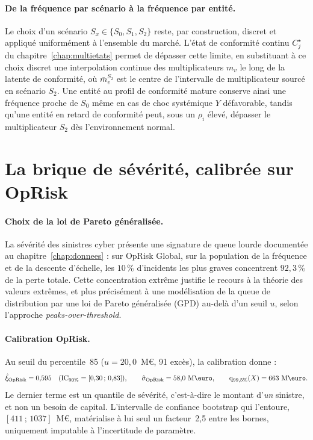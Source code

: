 \paragraph{De la fréquence par scénario à la fréquence par entité.} Le choix
d'un scénario $S_x \in \{S_0, S_1, S_2\}$ reste, par construction, discret et
appliqué uniformément à l'ensemble du marché. L'état de conformité continu
$C^\star_j$ du chapitre~\ref{chap:multietats} permet de dépasser cette
limite, en substituant à ce choix discret une interpolation continue des multiplicateurs
$m_v$ le long de la latente de conformité,
où $\bar{m}_v^{S_2}$ est le centre de l'intervalle de multiplicateur sourcé
en scénario $S_2$. Une entité au profil de conformité mature conserve ainsi
une fréquence proche de $S_0$ même en cas de choc systémique $Y$
défavorable, tandis qu'une entité en retard de conformité peut, sous un
$\rho_i$ élevé, dépasser le multiplicateur $S_2$ dès l'environnement normal.



\section{La brique de sévérité, calibrée sur OpRisk}
\label{soc:sec:severite}


\paragraph{Choix de la loi de Pareto généralisée.} La sévérité des sinistres
cyber présente une signature de queue lourde documentée au chapitre~\ref{chap:donnees} : sur
OpRisk Global, sur la population de la fréquence et de la descente d'échelle, les $10\,\%$ d'incidents les plus
graves concentrent $92{,}3\,\%$
de la perte totale. Cette concentration extrême justifie le recours à la
théorie des valeurs extrêmes, et plus précisément à une modélisation de la
queue de distribution par une loi de Pareto généralisée (GPD) au-delà d'un
seuil $u$, selon l'approche \emph{peaks-over-threshold}.

\paragraph{Calibration OpRisk.} Au seuil du percentile~85
($u = 20{,}0$~M\euro, 91 excès), la calibration donne :
\begin{equation}
\hat{\xi}_{\text{OpRisk}} = 0{,}595 \quad (\text{IC}_{90\%}=[0{,}30\,;\,0{,}83]),
\qquad
\hat{\sigma}_{\text{OpRisk}} = 58{,}0~\text{M\euro},
\qquad
\qsev_{99{,}5\%}(X) = 663~\text{M\euro}.
\end{equation}
Le dernier terme est un quantile de sévérité, c'est-à-dire le montant d'\emph{un}
sinistre, et non un besoin de capital. L'intervalle de confiance bootstrap qui l'entoure,
$[411\,;\,1037]$~M\euro, matérialise à lui seul un facteur~2{,}5 entre les bornes, uniquement
imputable à l'incertitude de paramètre.

